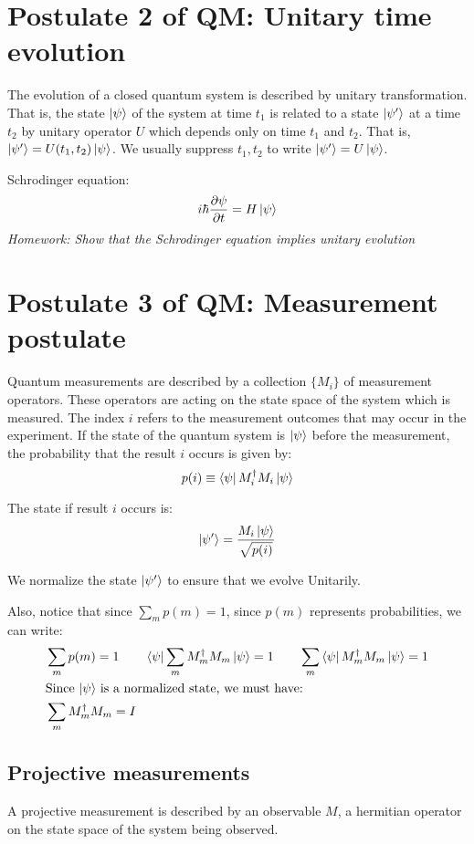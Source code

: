 \section{Postulate 2 of QM: Unitary time evolution}

The evolution of a closed quantum system is described by unitary transformation.
That is, the state $\ket \psi$ of the system at time $t_1$ is related to
a state  $\ket {\psi'}$ at a time $t_2$ by unitary operator $U$ which depends
only on time $t_1$ and $t_2$. That is, $\ket {\psi'} = U(t_1, t_2) \ket \psi$.
We usually suppress $t_1, t_2$ to write $\ket{\psi'} = U \ket{\psi}$.

Schrodinger equation: $$i \hbar \pdv{\psi}{t} = H \ket{\psi}$$
\textit{Homework: Show that the Schrodinger equation implies unitary evolution}

\section{Postulate 3 of QM: Measurement postulate}
Quantum measurements are described by a collection $\{ M_i \}$ of measurement
operators. These operators are acting on the state space of the system which is
measured.  The index $i$ refers to the measurement outcomes 
that may occur in the experiment. If the state of the quantum system is 
$\ket \psi$ before the measurement, the probability that the result $i$ occurs 
is given by: \[p(i) \equiv \bra{\psi} M^\dagger_i M_i \ket{\psi}\]

The state if result $i$ occurs is: \[  \ket{\psi'} = \frac{M_i \ket{\psi}}{\sqrt{p(i)}} \]

We normalize the state $\ket{\psi'}$ to ensure that we evolve Unitarily.

Also, notice that since $\sum_m p(m) = 1$, since $p(m)$ represents probabilities,
we can write:
\begin{align*}
    &\sum_m p(m) = 1 \qquad
    \bra{\psi}\sum_m   M_m^\dagger M_m \ket{\psi} = 1 \qquad
    \sum_m \bra{\psi} M_m^\dagger M_m \ket{\psi} = 1 \\
    &\text{Since $\ket{\psi}$ is a normalized state, we must have:} \\
    &\sum_m M_m^\dagger M_m = I
\end{align*}

\subsection{Projective measurements}
A projective measurement is described by an observable $M$, a hermitian
operator on the state space of the system being observed.

